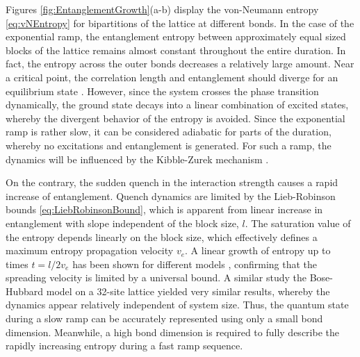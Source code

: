 Figures \ref{fig:EntanglementGrowth}(a-b) display the von-Neumann entropy \eqref{eq:vNEntropy} for bipartitions of the lattice at different bonds.
In the case of the exponential ramp, the entanglement entropy between approximately equal sized blocks of the lattice remains almost constant throughout the entire duration. In fact, the entropy across the outer bonds decreases a relatively large amount. Near a critical point, the correlation length and entanglement should diverge for an equilibrium state \cite{Zurek2005}. However, since the system crosses the phase transition dynamically, the ground state decays into a linear combination of excited states, whereby the divergent behavior of the entropy is avoided. Since the exponential ramp is rather slow, it can be considered adiabatic for parts of the duration, whereby no excitations and entanglement is generated. For such a ramp, the dynamics will be influenced by the Kibble-Zurek mechanism \cite{Braun2015}.

On the contrary, the sudden quench in the interaction strength causes a rapid increase of entanglement. Quench dynamics are limited by the Lieb-Robinson bounds \eqref{eq:LiebRobinsonBound}, which is apparent from linear increase in entanglement with slope independent of the block size, $l$.  The saturation value of the entropy depends linearly on the block size, which effectively defines a maximum entropy propagation velocity $v_e$. A linear growth of entropy up to times $t = l/2 v_e$ has been shown for different models \cite{Lauchli2008,Eisert2006,Amico2008,Calabrese2005}, confirming that the spreading velocity is limited by a universal bound. A similar study the Bose-Hubbard model on a 32-site lattice \cite{Lauchli2008} yielded very similar results, whereby the dynamics appear relatively independent of system size.
Thus, the quantum state during a slow ramp can be accurately represented using only a small bond dimension. Meanwhile, a high bond dimension is required to fully describe the rapidly increasing entropy during a fast ramp sequence. \\

